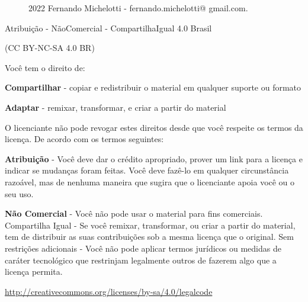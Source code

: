 
\begin{figure}
 

 \caption{2022 Fernando Michelotti - fernando.michelotti@ gmail.com.}
\end{figure}


Atribuição - NãoComercial - CompartilhaIgual 4.0 Brasil

(CC BY-NC-SA 4.0 BR)

Você tem o direito de:



\textbf{Compartilhar} - copiar e redistribuir o material em qualquer suporte ou formato

\textbf{Adaptar} - remixar, transformar, e criar a partir do material

O licenciante não pode revogar estes direitos desde que você respeite os termos da licença.
De acordo com os termos seguintes:


\textbf{Atribuição} - Você deve dar o crédito apropriado, prover um link para a licença
e indicar se mudanças foram feitas. Você deve fazê-lo em qualquer circunstância
razoável, mas de nenhuma maneira que sugira que o licenciante apoia você ou
o seu uso.


\textbf{Não Comercial} - Você não pode usar o material para fins comerciais.
Compartilha Igual - Se você remixar, transformar, ou criar a partir do material,
tem de distribuir as suas contribuições sob a mesma licença que o original.
Sem restrições adicionais - Você não pode aplicar termos jurídicos ou medidas de caráter
tecnológico que restrinjam legalmente outros de fazerem algo que a licença permita.


\url{http://creativecommons.org/licenses/by-sa/4.0/legalcode}


\clearpage
\newpage 

